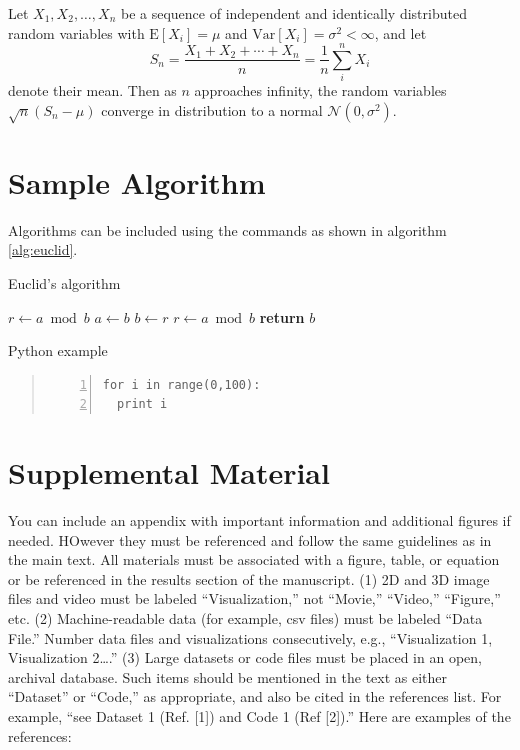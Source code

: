 \documentclass[9pt,twocolumn,twoside]{styles/osajnl}
\begin{document}
Let $X_1, X_2, \ldots, X_n$ be a sequence of independent and identically distributed random variables with $\text{E}[X_i] = \mu$ and $\text{Var}[X_i] = \sigma^2 < \infty$, and let
\begin{equation}
S_n = \frac{X_1 + X_2 + \cdots + X_n}{n}
      = \frac{1}{n}\sum_{i}^{n} X_i
\label{eq:refname1}
\end{equation}
denote their mean. Then as $n$ approaches infinity, the random variables $\sqrt{n}(S_n - \mu)$ converge in distribution to a normal $\mathcal{N}(0, \sigma^2)$.

\section{Sample Algorithm}

Algorithms can be included using the commands as shown in algorithm \ref{alg:euclid}.

\begin{algorithm}
\caption{Euclid’s algorithm}\label{alg:euclid}
\begin{algorithmic}[1]
\State $r\gets a\bmod b$
\State $a\gets b$
\State $b\gets r$
\State $r\gets a\bmod b$
\EndWhile\label{euclidendwhile}
\State \textbf{return} $b$
\EndProcedure
\end{algorithmic}
\end{algorithm}

\begin{algorithm}
\caption{Python example}\label{alg:python}
\begin{quote}
\begin{Verbatim}[numbers=left]
for i in range(0,100):
  print i
\end{Verbatim}
\end{quote}
\end{algorithm}

\section{Supplemental Material}

You can include an appendix with important information and additional figures if needed. HOwever they must be referenced and follow the same guidelines as in the main text.
All materials must be associated with a figure, table, or equation or be referenced in the results section of the manuscript. 
(1) 2D and 3D image files and video must be labeled “Visualization,” not “Movie,” “Video,” “Figure,” etc. 
(2) Machine-readable data (for example, csv files) must be labeled  “Data File.”  Number data files and visualizations consecutively, e.g., “Visualization 1, Visualization 2….”
(3) Large datasets or code files must be placed in an open, archival database.  Such items should be mentioned in the text as either “Dataset” or “Code,” as appropriate, and also be cited in the references list.  For example, “see Dataset 1 (Ref. [1]) and Code 1 (Ref [2]).” Here are examples of the references: 
\end{document}
